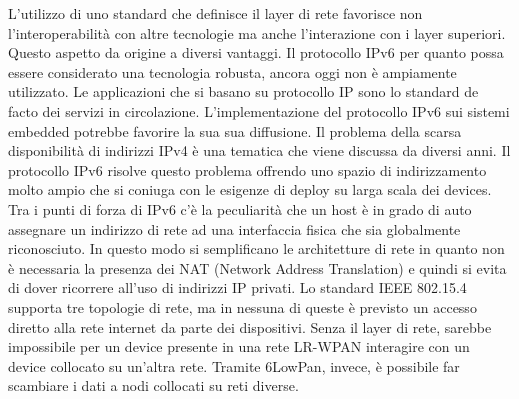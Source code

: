 \documentclass[12pt,a4paper,openright,twoside]{report}
\begin{document}
L'utilizzo di uno standard che definisce il layer di rete favorisce non l'interoperabilit\`a con altre tecnologie ma anche l'interazione con i layer superiori. Questo aspetto da origine a diversi vantaggi. 	
Il protocollo IPv6 per quanto possa essere considerato una tecnologia robusta, ancora oggi non \`e ampiamente utilizzato. Le applicazioni che si basano su protocollo IP sono lo standard de facto dei servizi in circolazione. 
L'implementazione del protocollo IPv6 sui sistemi embedded potrebbe favorire la sua sua diffusione.		
Il problema della scarsa disponibilit\`a di indirizzi IPv4 \`e una tematica che viene discussa da diversi anni. Il protocollo IPv6 risolve questo problema offrendo uno spazio di indirizzamento molto ampio che si coniuga con le esigenze di deploy su larga scala dei devices.	
Tra i punti di forza di IPv6 c'\`e la peculiarit\`a che un host \`e in grado di auto assegnare un indirizzo di rete ad una interfaccia fisica che sia globalmente riconosciuto. 
In questo modo si semplificano le architetture di rete in quanto non \`e necessaria la presenza dei NAT (Network Address Translation) e quindi si evita di dover ricorrere all'uso di indirizzi IP privati.   			
Lo standard IEEE 802.15.4 supporta tre topologie di rete, ma in nessuna di queste \`e previsto un accesso diretto alla rete internet da parte dei dispositivi. 
Senza il layer di rete, sarebbe impossibile per un device presente in una rete LR-WPAN interagire con un device collocato su un'altra rete. Tramite 6LowPan, invece, \`e possibile far scambiare i dati a nodi collocati su reti diverse.	
\end{document}

